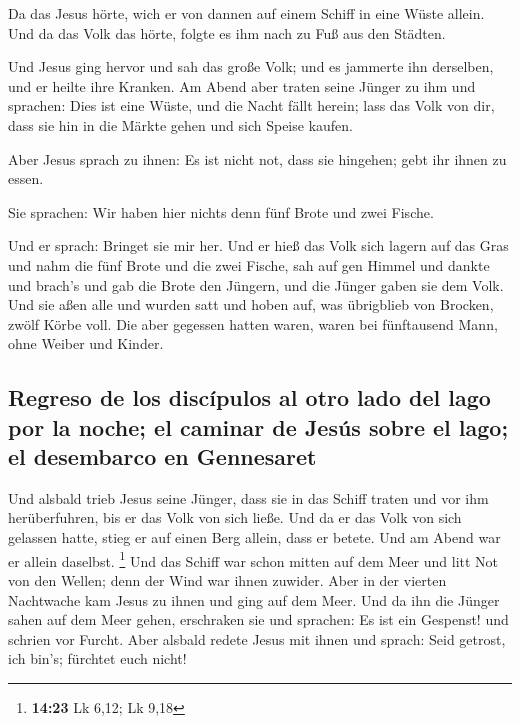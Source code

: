  Da das Jesus hörte, wich er von dannen auf einem Schiff
in eine Wüste allein. Und da das Volk das hörte, folgte es ihm nach zu
Fuß aus den Städten.

 Und Jesus ging hervor und sah das große Volk; und es
jammerte ihn derselben, und er heilte ihre Kranken.  Am
Abend aber traten seine Jünger zu ihm und sprachen: Dies ist eine Wüste,
und die Nacht fällt herein; lass das Volk von dir, dass sie hin in die
Märkte gehen und sich Speise kaufen.

 Aber Jesus sprach zu ihnen: Es ist nicht not, dass sie
hingehen; gebt ihr ihnen zu essen.

 Sie sprachen: Wir haben hier nichts denn fünf Brote und
zwei Fische.

 Und er sprach: Bringet sie mir her.  Und
er hieß das Volk sich lagern auf das Gras und nahm die fünf Brote und
die zwei Fische, sah auf gen Himmel und dankte und brach's und gab die
Brote den Jüngern, und die Jünger gaben sie dem Volk. 
Und sie aßen alle und wurden satt und hoben auf, was übrigblieb von
Brocken, zwölf Körbe voll.  Die aber gegessen hatten
waren, waren bei fünftausend Mann, ohne Weiber und Kinder.

\hypertarget{regreso-de-los-discuxedpulos-al-otro-lado-del-lago-por-la-noche-el-caminar-de-jesuxfas-sobre-el-lago-el-desembarco-en-gennesaret}{%
\subsection{Regreso de los discípulos al otro lado del lago por la
noche; el caminar de Jesús sobre el lago; el desembarco en
Gennesaret}\label{regreso-de-los-discuxedpulos-al-otro-lado-del-lago-por-la-noche-el-caminar-de-jesuxfas-sobre-el-lago-el-desembarco-en-gennesaret}}

 Und alsbald trieb Jesus seine Jünger, dass sie in das
Schiff traten und vor ihm herüberfuhren, bis er das Volk von sich ließe.
 Und da er das Volk von sich gelassen hatte, stieg er auf
einen Berg allein, dass er betete. Und am Abend war er allein daselbst.
\footnote{\textbf{14:23} Lk 6,12; Lk 9,18}  Und das
Schiff war schon mitten auf dem Meer und litt Not von den Wellen; denn
der Wind war ihnen zuwider.  Aber in der vierten
Nachtwache kam Jesus zu ihnen und ging auf dem Meer.  Und
da ihn die Jünger sahen auf dem Meer gehen, erschraken sie und sprachen:
Es ist ein Gespenst! und schrien vor Furcht.  Aber
alsbald redete Jesus mit ihnen und sprach: Seid getrost, ich bin's;
fürchtet euch nicht!

